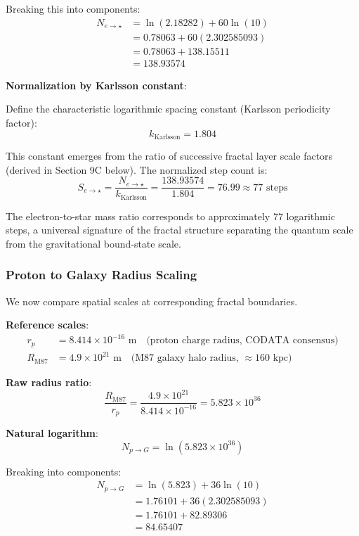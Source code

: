 \documentclass[11pt,a4paper]{article}
\begin{document}
Breaking this into components:
\begin{align*}
N_{e \to \star} &= \ln(2.18282) + 60 \ln(10)\\
&= 0.78063 + 60(2.302585093)\\
&= 0.78063 + 138.15511\\
&= 138.93574
\end{align*}

\noindent\textbf{Normalization by Karlsson constant}:

Define the characteristic logarithmic spacing constant (Karlsson periodicity factor):
\[
k_{\text{Karlsson}} = 1.804
\]

This constant emerges from the ratio of successive fractal layer scale factors (derived in Section 9C below). The normalized step count is:
\[
S_{e \to \star} = \frac{N_{e \to \star}}{k_{\text{Karlsson}}} = \frac{138.93574}{1.804} = 76.99 \approx \boxed{77 \text{ steps}}
\]

The electron-to-star mass ratio corresponds to approximately 77 logarithmic steps, a universal signature of the fractal structure separating the quantum scale from the gravitational bound-state scale.

\subsubsection{Proton to Galaxy Radius Scaling}

We now compare spatial scales at corresponding fractal boundaries.

\noindent\textbf{Reference scales}:
\begin{align*}
r_p &= 8.414 \times 10^{-16} \text{ m} \quad \text{(proton charge radius, CODATA consensus)}\\
R_{\text{M87}} &= 4.9 \times 10^{21} \text{ m} \quad \text{(M87 galaxy halo radius, $\approx 160$ kpc)}
\end{align*}

\noindent\textbf{Raw radius ratio}:
\[
\frac{R_{\text{M87}}}{r_p} = \frac{4.9 \times 10^{21}}{8.414 \times 10^{-16}} = 5.823 \times 10^{36}
\]

\noindent\textbf{Natural logarithm}:
\[
N_{p \to G} = \ln(5.823 \times 10^{36})
\]

Breaking into components:
\begin{align*}
N_{p \to G} &= \ln(5.823) + 36 \ln(10)\\
&= 1.76101 + 36(2.302585093)\\
&= 1.76101 + 82.89306\\
&= 84.65407
\end{align*}
\end{document}
